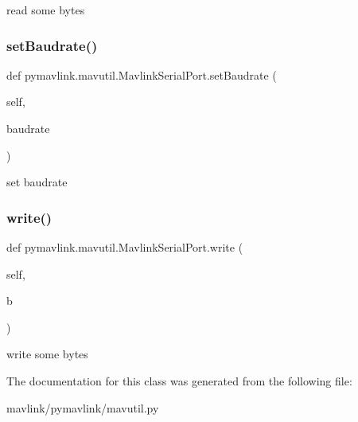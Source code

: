 \begin{DoxyVerb}read some bytes\end{DoxyVerb}
 \mbox{\label{classpymavlink_1_1mavutil_1_1MavlinkSerialPort_afdfd22c496aad11500d159499a5c15e0}} 
\subsubsection{\texorpdfstring{set\+Baudrate()}{setBaudrate()}}
{\footnotesize\ttfamily def pymavlink.\+mavutil.\+Mavlink\+Serial\+Port.\+set\+Baudrate (\begin{DoxyParamCaption}\item[{}]{self,  }\item[{}]{baudrate }\end{DoxyParamCaption})}

\begin{DoxyVerb}set baudrate\end{DoxyVerb}
 \mbox{\label{classpymavlink_1_1mavutil_1_1MavlinkSerialPort_a8e93f398163539282b8e7b8e1d0e1d94}} 
\subsubsection{\texorpdfstring{write()}{write()}}
{\footnotesize\ttfamily def pymavlink.\+mavutil.\+Mavlink\+Serial\+Port.\+write (\begin{DoxyParamCaption}\item[{}]{self,  }\item[{}]{b }\end{DoxyParamCaption})}

\begin{DoxyVerb}write some bytes\end{DoxyVerb}
 

The documentation for this class was generated from the following file\+:\begin{DoxyCompactItemize}
\item 
mavlink/pymavlink/mavutil.\+py\end{DoxyCompactItemize}

